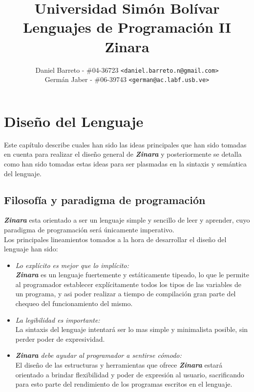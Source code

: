 \documentclass[12pt, spanish]{report}
\begin{document}
\title{Universidad Sim\'on Bol\'ivar \\ Lenguajes de Programaci\'on II \\ Zinara}
\author{
  Daniel Barreto - \#04-36723 \texttt{<daniel.barreto.n@gmail.com>} \\
  Germ\'an Jaber - \#06-39743 \texttt{<german@ac.labf.usb.ve>}
}
\maketitle

\tableofcontents

\newpage


\chapter{Dise\~no del Lenguaje}
\label{chap:diseno}

Este cap\'itulo describe cuales han sido las ideas principales que han
sido tomadas en cuenta para realizar el dise\~no general de
\emph{\textbf{Zinara}} y posteriormente se detalla como han sido
tomadas estas ideas para ser plasmadas en la sintaxis y sem\'antica del
lenguaje.


\section{Filosof\'ia y paradigma de programaci\'on}
\label{sec:filpar}

\textbf{\emph{Zinara}} esta orientado a ser un lenguaje simple y
sencillo de leer y aprender, cuyo paradigma de programaci\'on ser\'a
\'unicamente imperativo.\\

Los principales lineamientos tomados a la hora de desarrollar el
dise\~no del lenguaje han sido:

\begin{itemize}
\item \emph{Lo expl\'icito es mejor que lo impl\'icito:}\\
  \emph{\textbf{Zinara}} es un lenguaje fuertemente y est\'aticamente
  tipeado, lo que le permite al programador establecer expl\'icitamente
  todos los tipos de las variables de un programa, y asi poder
  realizar a tiempo de compilaci\'on gran parte del chequeo del
  funcionamiento del mismo.

\item \emph{La legibilidad es importante:}\\
  La sintaxis del lenguaje intentar\'a ser lo mas simple y minimalista
  posible, sin perder poder de expresividad.

\item \emph{\textbf{Zinara} debe ayudar al programador a sentirse
    c\'omodo:}\\
  El dise\~no de las estructuras y herramientas que ofrece
  \emph{\textbf{Zinara}} estar\'a orientado a brindar flexibilidad y
  poder de expresi\'on al usuario, sacrificando para esto parte del
  rendimiento de los programas escritos en el lenguaje.
\end{itemize}
\end{document}
